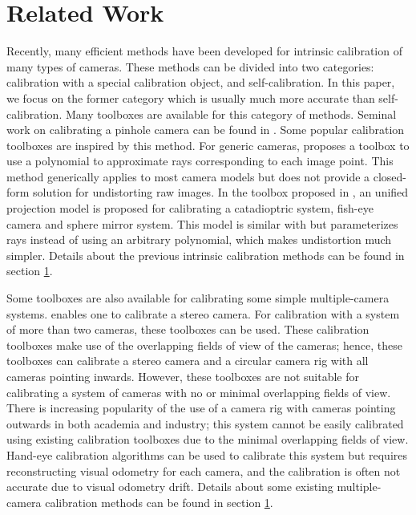 \documentclass{report}
\begin{document}
\section{Related Work}
Recently, many efficient methods have been developed for intrinsic calibration of many types of cameras. These methods can be divided into two categories: calibration with a special calibration object, and self-calibration. In this paper, we focus on the former category which is usually much more accurate than self-calibration. Many toolboxes are available for this category of methods. Seminal work on calibrating a pinhole camera can be found in \cite{zhang2000flexible}. Some popular calibration toolboxes \cite{bouguet2004camera,stoyanov2006camera} are inspired by this method. For generic cameras, \cite{scaramuzza2006toolbox} proposes a toolbox to use a polynomial to approximate rays corresponding to each image point. This method generically applies to most camera models but does not provide a closed-form solution for undistorting raw images. In the toolbox proposed in \cite{mei2007single}, an unified projection model is proposed for calibrating a catadioptric system, fish-eye camera and sphere mirror system. This model is similar with \cite{scaramuzza2006toolbox} but parameterizes rays instead of using an arbitrary polynomial, which makes undistortion much simpler. Details about the previous intrinsic calibration methods can be found in section \ref{}. 

Some toolboxes are also available for calibrating some simple multiple-camera systems. \cite{bouguet2004camera} enables one to calibrate a stereo camera. For calibration with a system of more than two cameras, these toolboxes \cite{svoboda2005convenient,easycal} can be used. These calibration toolboxes make use of the overlapping fields of view of the cameras; hence, these toolboxes can calibrate a stereo camera and a circular camera rig with all cameras pointing inwards. However, these toolboxes are not suitable for calibrating a system of cameras with no or minimal overlapping fields of view. There is increasing popularity of the use of a camera rig with cameras pointing outwards in both academia and industry; this system cannot be easily calibrated using existing calibration toolboxes due to the minimal overlapping fields of view. Hand-eye calibration algorithms \cite{tsai1989new,shiu1989calibration} can be used to calibrate this system but requires reconstructing visual odometry for each camera, and the calibration is often not accurate due to visual odometry drift. Details about some existing multiple-camera calibration methods can be found in section \ref{}. 
\end{document}
